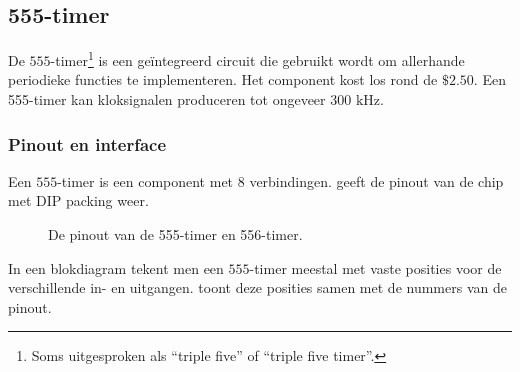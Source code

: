 \subsection{555-timer}
De $555$-timer\footnote{Soms uitgesproken als ``triple five'' of ``triple five timer''.} is een ge\"integreerd circuit die gebruikt wordt om allerhande periodieke functies te implementeren. Het component kost los rond de $\$ 2.50$. Een 555-timer kan kloksignalen produceren tot ongeveer $300\mbox{ kHz}$.
\subsubsection{Pinout en interface}
Een $555$-timer is een component met $8$ verbindingen.  geeft de pinout van de chip met DIP packing weer.
\begin{figure}[hbt]
\centering
{}
\caption{De pinout van de 555-timer en 556-timer.}
\end{figure}
In een blokdiagram tekent men een $555$-timer meestal met vaste posities voor de verschillende in- en uitgangen.  toont deze posities samen met de nummers van de pinout.
